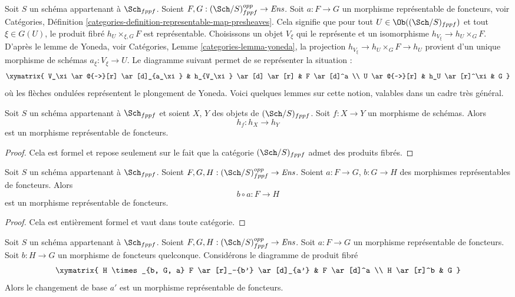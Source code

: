 \noindent
Soit $S$ un schéma appartenant à $\Sch_{fppf}$.
Soient $F, G : (\Sch/S)_{fppf}^{opp} \to \textit{Ens}$.
Soit $a : F \to G$ un morphisme représentable de foncteurs, voir
Catégories,
Définition \ref{categories-definition-representable-map-presheaves}.
Cela signifie que pour tout
$U \in \Ob((\Sch/S)_{fppf})$
et tout $\xi \in G(U)$, le produit fibré $h_U \times_{\xi, G} F$ est représentable.
Choisissons un objet $V_\xi$ qui le représente et un isomorphisme
$h_{V_\xi} \to h_U \times_G F$.
D'après le lemme de Yoneda, voir Catégories, Lemme \ref{categories-lemma-yoneda},
la projection $h_{V_\xi} \to h_U \times_G F \to h_U$ provient d'un unique
morphisme de schémas $a_\xi : V_\xi \to U$.
Le diagramme suivant permet de se représenter la situation :
$$
\xymatrix{
V_\xi \ar@{~>}[r] \ar[d]_{a_\xi} & h_{V_\xi} \ar[d] \ar[r] & F \ar[d]^a \\
U \ar@{~>}[r] & h_U \ar[r]^\xi & G
}
$$
où les flèches ondulées représentent le plongement de Yoneda.
Voici quelques lemmes sur cette notion, valables dans un cadre très général.

\begin{lemma}
\label{lemma-morphism-schemes-gives-representable-transformation}
Soit $S$ un schéma appartenant à $\Sch_{fppf}$ et soient
$X$, $Y$ des objets de $(\Sch/S)_{fppf}$.
Soit $f : X \to Y$ un morphisme de schémas.
Alors
$$
h_f : h_X \longrightarrow h_Y
$$
est un morphisme représentable de foncteurs.
\end{lemma}

\begin{proof}
Cela est formel et repose seulement sur le fait que
la catégorie $(\Sch/S)_{fppf}$ admet des produits fibrés.
\end{proof}

\begin{lemma}
\label{lemma-composition-representable-transformations}
Soit $S$ un schéma appartenant à $\Sch_{fppf}$.
Soient $F, G, H : (\Sch/S)_{fppf}^{opp} \to \textit{Ens}$.
Soient $a : F \to G$, $b : G \to H$ des morphismes représentables de foncteurs.
Alors
$$
b \circ a : F \longrightarrow H
$$
est un morphisme représentable de foncteurs.
\end{lemma}

\begin{proof}
Cela est entièrement formel et vaut dans toute catégorie.
\end{proof}

\begin{lemma}
\label{lemma-base-change-representable-transformations}
Soit $S$ un schéma appartenant à $\Sch_{fppf}$.
Soient $F, G, H : (\Sch/S)_{fppf}^{opp} \to \textit{Ens}$.
Soit $a : F \to G$ un morphisme représentable de foncteurs.
Soit $b : H \to G$ un morphisme de foncteurs quelconque.
Considérons le diagramme de produit fibré
$$
\xymatrix{
H \times_{b, G, a} F \ar[r]_-{b'} \ar[d]_{a'} & F \ar[d]^a \\
H \ar[r]^b & G
}
$$
Alors le changement de base $a'$ est un morphisme représentable de foncteurs.
\end{lemma}

